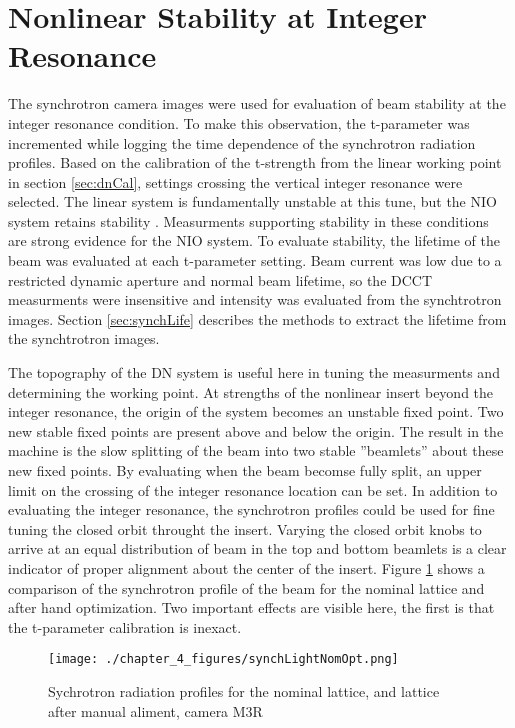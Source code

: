\section{Nonlinear Stability at Integer Resonance} \label{sec:intCross}
The synchrotron camera images were used for evaluation of beam stability at the integer resonance condition. To make this observation, the t-parameter was incremented while logging the time dependence of the synchrotron radiation profiles. Based on the calibration of the t-strength from the linear working point in section \ref{sec:dnCal}, settings crossing the vertical integer resonance were selected. The linear system is fundamentally unstable at this tune, but the NIO system retains stability . Measurments supporting stability in these conditions are strong evidence for the NIO system. To evaluate stability, the lifetime of the beam was evaluated at each t-parameter setting. Beam current was low due to a restricted dynamic aperture and normal beam lifetime, so the DCCT measurments were insensitive and intensity was evaluated from the synchtrotron images. Section \ref{sec:synchLife} describes the methods to extract the lifetime from the synchtrotron images.

The topography of the DN system is useful here in tuning the measurments and determining the working point. At strengths of the nonlinear insert beyond the integer resonance, the origin of the system becomes an unstable fixed point. Two new stable fixed points are present above and below the origin. The result in the machine is the slow splitting of the beam into two stable ”beamlets” about these new fixed points. By evaluating when the beam becomse fully split, an upper limit on the crossing of the integer resonance location can be set. In addition to evaluating the integer resonance, the synchrotron profiles could be used for fine tuning the closed orbit throught the insert. Varying the closed orbit knobs to arrive at an equal distribution of beam in the top and bottom beamlets is a  clear indicator of proper alignment about the center of the insert. Figure \ref{fig:synchCenter} shows a comparison of the synchrotron profile of the beam for the nominal lattice and after hand optimization. Two important effects are visible here, the first is that the t-parameter calibration is inexact. 

\begin{figure}
	\centering
	\texttt{[image: ./chapter\_4\_figures/synchLightNomOpt.png]}
	\caption{Sychrotron radiation profiles for the nominal lattice, and lattice after manual aliment, camera M3R}
	\label{fig:synchCenter}
\end{figure}

